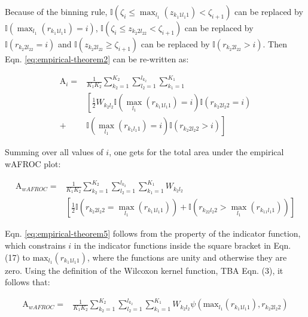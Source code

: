 \documentclass[
]{book}
\begin{document}
Because of the binning rule, \(\mathbb{I}\left ( \zeta_i \leq \max_{l_1} \left (z_{k_1 1 l_1 1} \right ) < \zeta_{i+1} \right )\) can be replaced by \(\mathbb{I}\left ( \max_{l_1} \left (r_{k_1 1 l_1 1} \right ) = i \right )\), \(\mathbb{I}\left ( \zeta_i \leq z_{k_2 2l_22} < \zeta_{i+1} \right )\) can be replaced by \(\mathbb{I}\left ( r_{k_2 2l_22} = i \right )\) and \(\mathbb{I}\left (z_{k_2 2l_22} \geq \zeta_{i+1} \right )\) can be replaced by \(\mathbb{I}\left (r_{k_2 2l_22} > i \right )\). Then Eqn. \eqref{eq:empirical-theorem2} can be re-written as:

\begin{equation}
\begin{aligned}
\text{A}_i =& \frac{1}{K_1K_2}  \sum_{k_2=1}^{K_2} \sum_{l_2=1}^{l_{k_2}}\sum_{k_1=1}^{K_1} \\
&\left [ \frac{1}{2} W_{k_2l_2} \mathbb{I}\left ( \max_{l_1} \left (r_{k_1 1 l_1 1}  \right ) = i  \right )\mathbb{I}\left ( r_{k_2 2 l_2 2} = i\right ) \right. \\
+& \left. \mathbb{I}\left ( \max_{l_1} \left (r_{k_1 l_1 1}  \right ) = i  \right )\mathbb{I}\left ( r_{k_2 2 l_2 2} > i \right )  \right ]
\end{aligned}
\label{eq:empirical-theorem5}
\end{equation}

Summing over all values of \(i\), one gets for the total area under the empirical wAFROC plot:

\begin{equation}
\begin{aligned}
\text{A}_{wAFROC} =& \frac{1}{K_1K_2}  \sum_{k_2=1}^{K_2} \sum_{l_2=1}^{l_{k_2}}\sum_{k_1=1}^{K_1} W_{k_2l_2} \\
&\left [ \frac{1}{2} \mathbb{I}\left ( r_{k_2 2l_2 2} = \max_{l_1} \left (r_{k_1 1l_1 1}  \right )  \right ) + \mathbb{I}\left ( r_{k_22 l_2 2} > \max_{l_1} \left (r_{k_11 l_1 1}  \right )  \right )  \right ]
\end{aligned}
\label{eq:empirical-theorem6}
\end{equation}

Eqn. \eqref{eq:empirical-theorem5} follows from the property of the indicator function, which constrains \(i\) in the indicator functions inside the square bracket in Eqn. (17) to \(\text{max}_{l_1} \left ( r_{k_1 1 l_1 1} \right )\), where the functions are unity and otherwise they are zero. Using the definition of the Wilcoxon kernel function, TBA Eqn. (3), it follows that:

\begin{equation}
\begin{aligned}
\text{A}_{wAFROC} =& \frac{1}{K_1K_2}  \sum_{k_2=1}^{K_2} \sum_{l_2=1}^{l_{k_2}}\sum_{k_1=1}^{K_1} W_{k_2l_2} \psi\left ( \text{max}_{l_1} \left ( r_{k_1 1 l_1 1} \right ) , r_{k_2 2 l_2 2} \right )
\end{aligned}
\label{eq:empirical-theorem7}
\end{equation}
\end{document}
